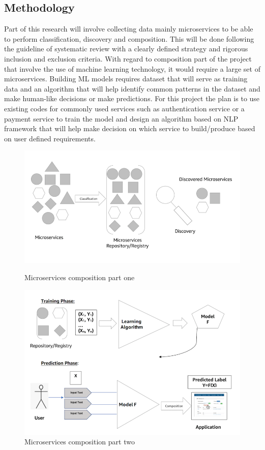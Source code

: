 \documentclass{article}
\begin{document}
\subsection{Methodology}
Part of this research will involve collecting data mainly microservices to be able to perform classification, discovery and composition. This will be done following the guideline of systematic review with a clearly defined strategy and rigorous inclusion and exclusion criteria. With regard to composition part of the project that involve the use of machine learning technology, it would require a large set of microservices. Building ML models requires dataset that will serve as training data and an algorithm that will help identify common patterns in the dataset and make human-like decisions or make predictions. For this project the plan is to use existing codes for commonly used services such as authentication service or a payment service to train the model and design an algorithm based on NLP framework that will help make decision on which service to build/produce based on user defined requirements.


\begin{figure}[h!]
\includegraphics{discovery.png}
\caption{Microservices composition part one}
\includegraphics{mcsvcomposition.png}
\caption{Microservices composition part two}
\end{figure}
\end{document}
